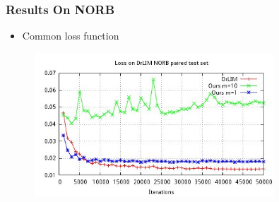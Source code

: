 \documentclass[10pt]{beamer}
\begin{document}
\begin{frame}
    \frametitle{Results On NORB}
    \begin{itemize}
        \item Common loss function
    \end{itemize}

    \begin{figure}[h]
        \begin{center}
            \includegraphics[width=0.8\textwidth]{../report/thesis_figures/final_loss_testv3.jpg}
        \end{center}
    \end{figure}
\end{frame}
\end{document}
